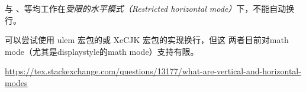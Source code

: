 










与 、等均工作在\textit{受限的水平模式（Restricted
  horizontal mode）}下，不能自动换行。

可以尝试使用 ulem 宏包的或 XeCJK 宏包的实现换行，但这
两者目前对math mode（尤其是displaystyle的math mode）支持有限。

\begin{reference}
\item \url{https://tex.stackexchange.com/questions/13177/what-are-vertical-and-horizontal-modes}
\end{reference}













